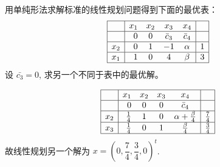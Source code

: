 \begin{Problem}
    用单纯形法求解标准的线性规划问题得到下面的最优表：
    \[
        \begin{array}{|l|rccc|c|}
            \hline & x_{1} & x_{2} & x_{3} & x_{4} & \\
            \hline & 0 & 0 & \bar{c}_{3} & \bar{c}_{4} & \\
            \hline x_{2} & 0 & 1 & -1 & \alpha & 1 \\
            \hline x_{1} & 1 & 0 & 4 & \beta & 3 \\
            \hline
        \end{array}
    \]
    设 $\bar{c_3} = 0$, 求另一个不同于表中的最优解。

    \Answer 
    \[
        \begin{array}{|l|rccc|c|}
            \hline & x_{1} & x_{2} & x_{3} & x_{4} & \\
            \hline & 0 & 0 & 0 & \bar{c}_{4} & \\
            \hline x_{2} & \frac{1}{4} & 1 & 0 & \alpha + \frac{\beta}{4} & \frac{7}{4} \\
            \hline x_{3} & \frac{1}{4} & 0 & 1 & \frac{\beta}{4} & \frac{3}{4} \\
            \hline
        \end{array}
    \]
    故线性规划另一个解为 $x = \left(0, \dfrac{7}{4}, \dfrac{3}{4}, 0\right)^t$.
\end{Problem}

